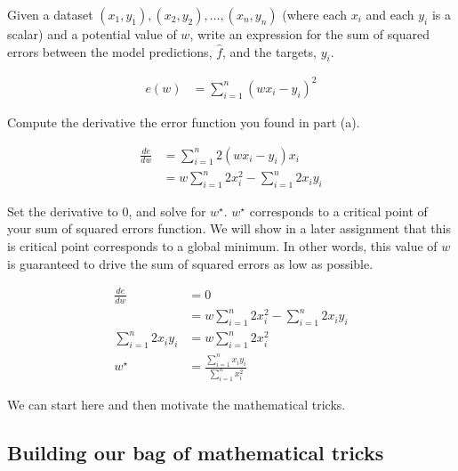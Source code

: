 \documentclass[assignment01_Solutions]{subfiles}
\begin{document}
\begin{exercise}
\bes
\item Given a dataset $(x_1, y_1), (x_2, y_2), \ldots, (x_n, y_n)$ (where each $x_i$ and each $y_i$ is a scalar) and a potential value of $w$, write an expression for the sum of squared errors between the model predictions, $\hat{f}$, and the targets, $y_i$.

\begin{boxedsolution}
\begin{align}
e(w) &= \sum_{i=1}^n \left (  w x_i - y_i \right)^2
\end{align}
\end{boxedsolution}
\fi

\item Compute the derivative the error function you found in part (a).

\begin{boxedsolution}
\begin{align}
\frac{de}{dw} &= \sum_{i=1}^n 2 \left (  w x_i - y_i \right)x_i \\
&= w \sum_{i=1}^n 2 x_i^2 - \sum_{i=1}^n 2 x_i y_i
\end{align}
\end{boxedsolution}
\fi

\item Set the derivative to 0, and solve for $w^\star$.  $w^\star$ corresponds to a critical point of your sum of squared errors function.  We will show in a later assignment that this is critical point corresponds to a global minimum.  In other words, this value of $w$ is guaranteed to drive the sum of squared errors as low as possible.

\begin{boxedsolution}
\begin{align}
\frac{de}{dw} &= 0 \\
&= w \sum_{i=1}^n 2 x_i^2 - \sum_{i=1}^n 2 x_i y_i \\
\sum_{i=1}^n 2 x_i y_i  &= w \sum_{i=1}^n 2 x_i^2 \\
w^\star &=\frac{\sum_{i=1}^n x_i y_i}{\sum_{i=1}^n x_i^2}
\end{align}
\end{boxedsolution}
\fi

\ees


\end{exercise}
We can start here and then motivate the mathematical tricks.

\subsection{Building our bag of mathematical tricks}
\end{document}
